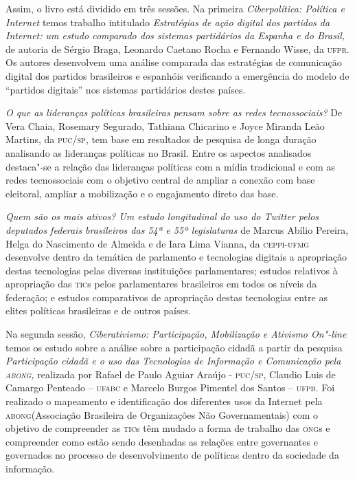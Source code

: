 Assim, o livro está dividido em três sessões. Na primeira
\emph{Ciberpolítica: \emph{Política e Internet }}temos trabalho
intitulado \emph{Estratégias de ação digital dos partidos da Internet:
um estudo comparado dos sistemas partidários da Espanha e do Brasil,} de
autoria de Sérgio Braga, Leonardo Caetano Rocha e Fernando Wisse, da
\textsc{ufpr}. Os autores desenvolvem uma análise comparada das estratégias de
comunicação digital dos partidos brasileiros e espanhóis verificando a
emergência do modelo de ``partidos digitais'' nos sistemas partidários
destes países.

\emph{O que as lideranças políticas brasileiras pensam sobre as redes
tecnossociais?} De Vera Chaia, Rosemary Segurado, Tathiana Chicarino e
Joyce Miranda Leão Martins, da \textsc{puc}/\textsc{sp}, tem base em resultados de
pesquisa de longa duração analisando as lideranças políticas no Brasil.
Entre os aspectos analisados destaca"-se a relação das lideranças
políticas com a mídia tradicional e com as redes tecnossociais com o
objetivo central de ampliar a conexão com base eleitoral, ampliar a
mobilização e o engajamento direto das base.

\emph{Quem são os mais ativos? Um estudo longitudinal do uso do Twitter
pelos deputados federais brasileiros das 54ª e 55ª legislaturas} de
Marcus Abílio Pereira, Helga do Nascimento de Almeida e de Iara Lima
Vianna, da \textsc{ceppi}-\textsc{ufmg} desenvolve dentro da temática de parlamento e
tecnologias digitais a apropriação destas tecnologias pelas diversas
instituições parlamentares; estudos relativos à apropriação das \textsc{tic}s
pelos parlamentares brasileiros em todos os níveis da federação; e
estudos comparativos de apropriação destas tecnologias entre as elites
políticas brasileiras e de outros países.

Na segunda sessão, \emph{Ciberativismo: Participação, Mobilização e
Ativismo On"-line} temos os estudo sobre a análise sobre a participação
cidadã a partir da pesquisa \emph{Participação cidadã e o uso das
Tecnologias de Informação e Comunicação pela \textsc{abong},} realizada por
Rafael de Paulo Aguiar Araújo - \textsc{puc}/\textsc{sp}, Claudio Luis de Camargo Penteado
-- \textsc{ufabc} e Marcelo Burgos Pimentel dos Santos -- \textsc{ufpb}. Foi realizado o
mapeamento e identificação dos diferentes usos da Internet pela
\textsc{abong}(Associação Brasileira de Organizações Não Governamentais) com o
objetivo de compreender as \textsc{tic}s têm mudado a forma de trabalho das \textsc{ong}s
e compreender como estão sendo desenhadas as relações entre governantes
e governados no processo de desenvolvimento de políticas dentro da
sociedade da informação.

